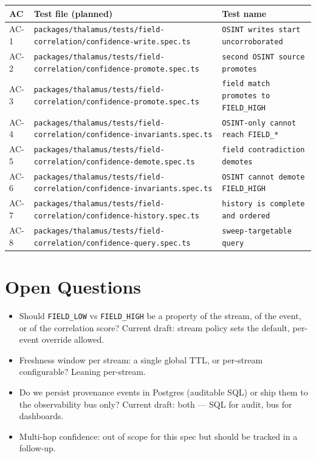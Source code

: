 \begin{center}
\begin{tabular}{@{}lll@{}}
\toprule
AC & Test file (planned) & Test name \\
\midrule
AC-1 & \texttt{packages/thalamus/tests/field-correlation/confidence-write.spec.ts} & \texttt{OSINT writes start uncorroborated} \\
AC-2 & \texttt{packages/thalamus/tests/field-correlation/confidence-promote.spec.ts} & \texttt{second OSINT source promotes} \\
AC-3 & \texttt{packages/thalamus/tests/field-correlation/confidence-promote.spec.ts} & \texttt{field match promotes to FIELD\_HIGH} \\
AC-4 & \texttt{packages/thalamus/tests/field-correlation/confidence-invariants.spec.ts} & \texttt{OSINT-only cannot reach FIELD\_*} \\
AC-5 & \texttt{packages/thalamus/tests/field-correlation/confidence-demote.spec.ts} & \texttt{field contradiction demotes} \\
AC-6 & \texttt{packages/thalamus/tests/field-correlation/confidence-invariants.spec.ts} & \texttt{OSINT cannot demote FIELD\_HIGH} \\
AC-7 & \texttt{packages/thalamus/tests/field-correlation/confidence-history.spec.ts} & \texttt{history is complete and ordered} \\
AC-8 & \texttt{packages/thalamus/tests/field-correlation/confidence-query.spec.ts} & \texttt{sweep-targetable query} \\
\bottomrule
\end{tabular}
\end{center}

\section{Open Questions}
\begin{itemize}[leftmargin=1.2em]
  \item Should \texttt{FIELD\_LOW} vs \texttt{FIELD\_HIGH} be a property of the stream, of the event, or of the correlation score? Current draft: stream policy sets the default, per-event override allowed.
  \item Freshness window per stream: a single global TTL, or per-stream configurable? Leaning per-stream.
  \item Do we persist provenance events in Postgres (auditable SQL) or ship them to the observability bus only? Current draft: both --- SQL for audit, bus for dashboards.
  \item Multi-hop confidence: out of scope for this spec but should be tracked in a follow-up.
\end{itemize}



